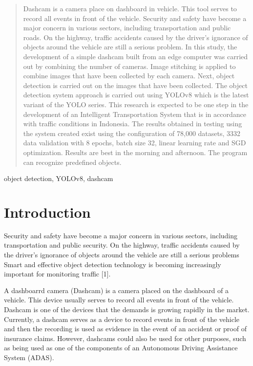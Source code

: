\documentclass[conference]{IEEEtran}
\begin{document}
\begin{abstract}
Dashcam is a camera place on dashboard  in vehicle. This tool serves to record all events in front of the vehicle. 
Security and safety have become a major concern in various sectors, including transportation and public roads. 
On the highway, traffic accidents caused by the driver's ignorance of objects around the vehicle are still a serious problem. 
In this study, the development of a simple dashcam built from an edge computer was carried out by combining the number of cameras. Image stitching is applied to combine images that have been collected by each camera.  
Next, object detection is carried out on the images that have been collected. The object detection system approach is carried out using YOLOv8 which is the latest variant of the YOLO series. This research is expected to be one step in the development of an Intelligent Transportation System that is in accordance with traffic conditions in Indonesia.
The results obtained in testing using the system created exist using the configuration of 78,000 datasets, 3332 data validation with 8 epochs, batch size 32, linear learning rate and SGD optimization. Results are best in the morning and afternoon. The program can recognize predefined objects. 
\end{abstract}

\begin{IEEEkeywords}
object detection, YOLOv8, dashcam
\end{IEEEkeywords}

\section{Introduction}
Security and safety have become a major concern in various sectors, including transportation and public security. On the highway, traffic accidents caused by the driver's ignorance of objects around the vehicle are still a serious problems
Smart and effective object detection technology is becoming increasingly important for monitoring traffic [1].

A dashboarrd camera (Dashcam) is a camera placed on the dashboard of a vehicle. This device usually serves to record all events in front of the vehicle.
Dashcam is one of the devices that the demands is growing rapidly in the market. Currently, a dashcam serves as a device to record events in front of the vehicle and then the recording is used as evidence in the event of an accident or proof of insurance claims. 
However, dashcams could also be used for other purposes, such as being used as one of the components of an Autonomous Driving Assistance System (ADAS). 
\end{document}
